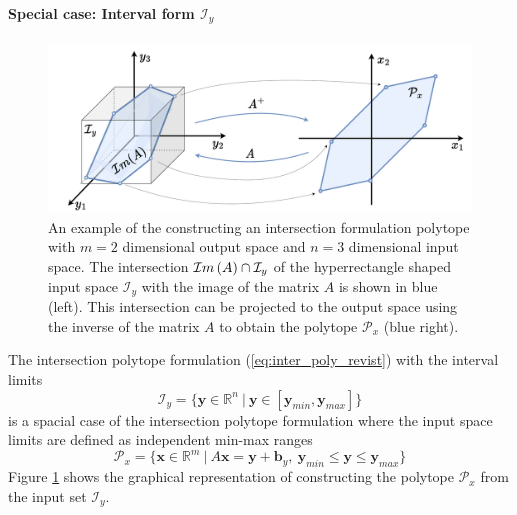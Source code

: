 \paragraph*{Special case: Interval form $\mathcal{I}_y$}  
\label{par:intersection_interval_algos_h}
\begin{figure}
    \centering
    \includegraphics[width=0.8\linewidth]{Chapters/imgs/intersection.pdf}
    \caption{An example of the constructing an intersection formulation polytope with $m=2$ dimensional output space and $n=3$ dimensional input space. The intersection $\mathcal{I}m\left(A\right) \cap \mathcal{I}_y$ of the hyperrectangle shaped input space $\mathcal{I}_y$ with the image of the matrix $A$ is shown in blue (left). This intersection can be projected to the output space using the inverse of the matrix $A$ to obtain the polytope $\mathcal{P}_x$ (blue right).}
    \label{fig:inter}
\end{figure}

The intersection polytope formulation (\ref{eq:inter_poly_revist}) with the interval limits 
\begin{equation}
    \mathcal{I}_y = \{ \bm{y}\in\mathbb{R}^n ~|~ \bm{y}\in[\bm{y}_{min},\bm{y}_{max}]\}
\end{equation}
is a spacial case of the intersection polytope formulation where the input space limits are defined as independent min-max ranges 
\begin{equation}
    \mathcal{P}_x=\{\bm{x}\in\mathbb{R}^m~ |~ A\bm{x} = \bm{y} + \bm{b}_y,~\bm{y}_{min} \leq  \bm{y} \leq \bm{y}_{max}  \}
    \label{eq:inter_hyp}
\end{equation}
Figure \ref{fig:inter} shows the graphical representation of constructing the polytope $\mathcal{P}_x$ from the input set $\mathcal{I}_y$.

